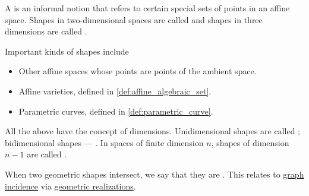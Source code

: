 \begin{concept}\label{con:geometric_shape}
  A  is an informal notion that refers to certain special sets of points in an affine space. Shapes in two-dimensional spaces are called  and shapes in three dimensions are called .

  Important kinds of shapes include
  \begin{itemize}
    \item Other affine spaces whose points are points of the ambient space.
    \item Affine varieties, defined in \cref{def:affine_algebraic_set}.
    \item Parametric curves, defined in \cref{def:parametric_curve}.
  \end{itemize}

  All the above have the concept of dimensions. Unidimensional shapes are called ; bidimensional shapes --- . In spaces of finite dimension \( n \), shapes of dimension \( n - 1 \) are called .

  When two geometric shapes intersect, we say that they are . This relates to \hyperref[def:graph_incidence]{graph incidence} via \hyperref[def:graph_geometric_realization]{geometric realizations}.
\end{concept}

